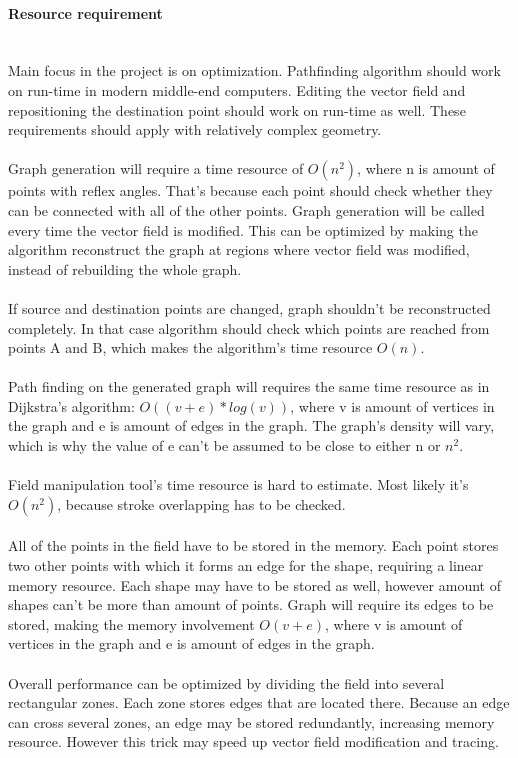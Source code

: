 \documentclass[a4paper,12pt]{article}
\begin{document}
\paragraph{Resource requirement} \hspace{0pt} \\
Main focus in the project is on optimization. Pathfinding algorithm should work on run-time in
modern middle-end computers. Editing the vector field and repositioning the destination point
should work on run-time as well. These requirements should apply with relatively complex geometry.
\\
\\
Graph generation will require a time resource of $O(n^2)$, where n is amount of points with reflex angles. That's because each point should check whether they can be connected with all of the other points. Graph generation will be called every time the vector field is modified. This can be optimized by making the algorithm reconstruct the graph at regions where vector field was modified, instead of rebuilding the whole graph.
\\
\\
If source and destination points are changed, graph shouldn't be reconstructed completely. In that case algorithm should check which points are reached from points A and B, which makes the algorithm's time resource $O(n)$.
\\
\\
Path finding on the generated graph will requires the same time resource as in Dijkstra's algorithm: $O((v+e)*log(v))$, where v is amount of vertices in the graph and e is amount of edges in the graph. The graph's density will vary, which is why the value of e can't be assumed to be close to either n or $n^2$.
\\
\\
Field manipulation tool's time resource is hard to estimate. Most likely it's $O(n^2)$, because stroke overlapping has to be checked.
\\
\\
All of the points in the field have to be stored in the memory. Each point stores two other points with which it forms an edge for the shape, requiring a linear memory resource. Each shape may have to be stored as well, however amount of shapes can't be more than amount of points. Graph will require its edges to be stored, making the memory involvement $O(v+e)$, where v is amount of vertices in the graph and e is amount of edges in the graph.
\\
\\
Overall performance can be optimized by dividing the field into several rectangular zones. Each zone stores edges that are located there. Because an edge can cross several zones, an edge may be stored redundantly, increasing memory resource. However this trick may speed up vector field modification and tracing.
\end{document}
